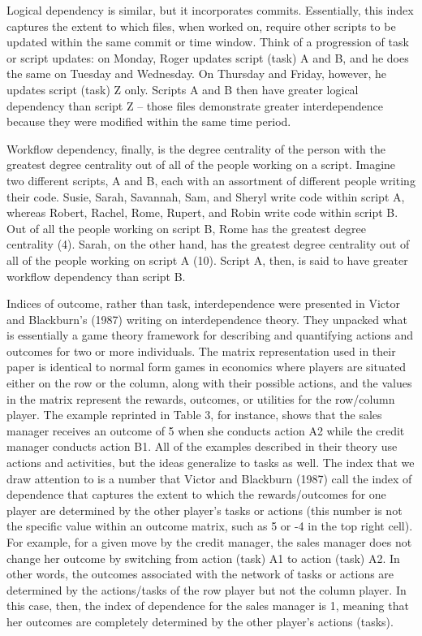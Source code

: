 \documentclass[english,,man]{apa6}
\theoremstyle{definition}
\theoremstyle{definition}
\theoremstyle{definition}
\theoremstyle{remark}
\begin{document}
Logical dependency is similar, but it incorporates commits. Essentially,
this index captures the extent to which files, when worked on, require
other scripts to be updated within the same commit or time window. Think
of a progression of task or script updates: on Monday, Roger updates
script (task) A and B, and he does the same on Tuesday and Wednesday. On
Thursday and Friday, however, he updates script (task) Z only. Scripts A
and B then have greater logical dependency than script Z -- those files
demonstrate greater interdependence because they were modified within
the same time period.

Workflow dependency, finally, is the degree centrality of the person
with the greatest degree centrality out of all of the people working on
a script. Imagine two different scripts, A and B, each with an
assortment of different people writing their code. Susie, Sarah,
Savannah, Sam, and Sheryl write code within script A, whereas Robert,
Rachel, Rome, Rupert, and Robin write code within script B. Out of all
the people working on script B, Rome has the greatest degree centrality
(4). Sarah, on the other hand, has the greatest degree centrality out of
all of the people working on script A (10). Script A, then, is said to
have greater workflow dependency than script B.

Indices of outcome, rather than task, interdependence were presented in
Victor and Blackburn's (1987) writing on interdependence theory. They
unpacked what is essentially a game theory framework for describing and
quantifying actions and outcomes for two or more individuals. The matrix
representation used in their paper is identical to normal form games in
economics where players are situated either on the row or the column,
along with their possible actions, and the values in the matrix
represent the rewards, outcomes, or utilities for the row/column player.
The example reprinted in Table 3, for instance, shows that the sales
manager receives an outcome of 5 when she conducts action A2 while the
credit manager conducts action B1. All of the examples described in
their theory use actions and activities, but the ideas generalize to
tasks as well. The index that we draw attention to is a number that
Victor and Blackburn (1987) call the index of dependence that captures
the extent to which the rewards/outcomes for one player are determined
by the other player's tasks or actions (this number is not the specific
value within an outcome matrix, such as 5 or -4 in the top right cell).
For example, for a given move by the credit manager, the sales manager
does not change her outcome by switching from action (task) A1 to action
(task) A2. In other words, the outcomes associated with the network of
tasks or actions are determined by the actions/tasks of the row player
but not the column player. In this case, then, the index of dependence
for the sales manager is 1, meaning that her outcomes are completely
determined by the other player's actions (tasks).
\end{document}
